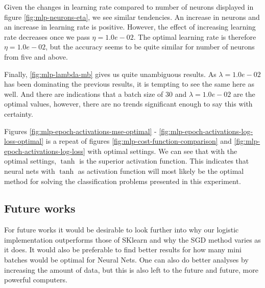 Given the changes in learning rate compared to number of neurons displayed in figure \ref{fig:mlp-neurons-eta}, we see similar tendencies. An increase in neurons and an increase in learning rate is positive. However, the effect of increasing learning rate decreases once we pass $\eta = 1.0e-02$. The optimal learning rate is therefore $\eta = 1.0e-02$, but the accuracy seems to be quite similar for number of neurons from five and above. 
 
Finally, \ref{fig:mlp-lambda-mb} gives us quite unambiguous results. As $\lambda = 1.0e-02$ has been dominating the previous results, it is tempting to see the same here as well. And there are indications that a batch size of 30 and $\lambda = 1.0e-02$ are the optimal values, however, there are no trends significant enough to say this with certainty. 

Figures \ref{fig:mlp-epoch-activations-mse-optimal} - \ref{fig:mlp-epoch-activations-log-loss-optimal} is a repeat of figures \ref{fig:mlp-cost-function-comparison} and \ref{fig:mlp-epoch-activations-log-loss} with optimal settings. We can see that with the optimal settings, $\tanh$ is the superior activation function. This indicates that neural nets with $\tanh$ as activation function will most likely be the optimal method for solving the classification problems presented in this experiment.
\subsection{Future works}

For future works it would be desirable to look further into why our logistic implementation outperforms those of SKlearn and why the SGD method varies as it does. It would also be preferable to find better results for how many mini batches would be optimal for Neural Nets. One can also do better analyses by increasing the amount of data, but this is also left to the future and future, more powerful computers.


